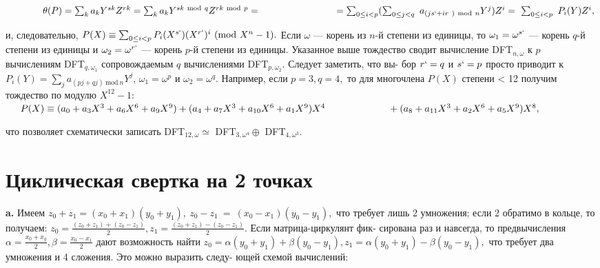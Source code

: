 \documentclass{mai_book}
\begin{document}
$\indent~~~~~~~\theta(P)=\sum_ka_kY^{sk}Z^{rk}=\sum_ka_kY^{sk~\text{mod}~q}Z^{rk~\text{mod}~p}=\\
\indent~~~~~~~~~~~~~~~~~~~=\sum_{0\leq i<p}(\sum_{0\leq j<q}~a_{(js`+ir~)~\text{mod}~n}Y^j)Z^i=~\sum_{0\leq i<p}~P_i(Y)Z^i, \\ 
$

\noindent и, следовательно, $P(X)\equiv\sum_{0\leq i<p}P_i(X^{s`})(X^{r`})^i~(\text{mod}~X^n-1).$ Если $\omega$\linebreak
--- корень из $n$-й степени из единицы, то $\omega_1=\omega^{s`}$ --- корень $q$-й степени\linebreak
из единицы и $\omega_2=\omega^{r`}$ --- корень $p$-й степени из единицы. Указанное\linebreak
выше тождество сводит вычисление D{\footnotesize FT}$_{n,\omega}$  к $p$ вычислениям D{\footnotesize FT}$_{q,\omega_1}$\linebreak
сопровождаемым $q$ вычислениями D{\footnotesize FT}$_{p,\omega_2}$. Следует заметить, что вы-\linebreak
бор $r`=q$ и $s`=p$ просто приводит к $P_i(Y)=\sum_ja_{(pj+qj)~\text{mod}~n}Y^j$,\linebreak
$\omega_1=\omega^p$ и $\omega_2=\omega^q.$ Например, если $p=3,q=4,$ то для многочлена\linebreak
$P(X)$ степени < 12 получим тождество по модулю $X^{12}-1:$ \\

$\indent P(X)\equiv(a_0+a_3X^3+a_6X^6+a_9X^9)+(a_4+a_7X^3+a_{10}X^6+a_1X^9)X^4 \\
\indent~~~~~~~~~~~~~~~+(a_8+a_{11}X^3+a_2X^6+a_5X^9)X^8, \\$


\noindent что позволяет схематически записать  D{\footnotesize FT}$_{12,\omega}\simeq $ D{\footnotesize FT}$_{3,\omega^4}\oplus$ D{\footnotesize FT}$_{4,\omega^3}$.
\section{Циклическая свертка на 2 точках} 

\indent\textbf{a.} Имеем $z_0+z_1=(x_0+x_1)(y_0+y_1),~z_0-z_1~=~(x_0-x_1)(y_0-y_1),$\linebreak
что требует лишь 2 умножения; если 2 обратимо в кольце, то получаем:\linebreak
$z_0=\frac{(z_0+z_1)+(z_0-z_1)}{2},z_1=\frac{(z_0+z_1)-(z_0-z_1)}{2}.$ Если матрица-циркулянт фик-\linebreak
сирована раз и навсегда, то предвычисления $\alpha=\frac{x_0+x_q}{2},\beta=\frac{x_0-x_1}{2}$ дают\linebreak
возможность найти $z_0=\alpha(y_0+y_1)+\beta(y_0-y_1),z_1=\alpha(y_0+y_1)-\beta(y_0-y_1),$\linebreak
что требует два умножения и 4 сложения. Это можно выразить следу-\linebreak
ющей схемой вычислений:\\
\end{document}
